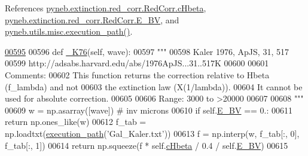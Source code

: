 \begin{DoxyVerb}
References \hyperlink{red__corr_8py_source_l00206}{pyneb.\-extinction.\-red\-\_\-corr.\-Red\-Corr.\-c\-Hbeta}, \hyperlink{red__corr_8py_source_l00203}{pyneb.\-extinction.\-red\-\_\-corr.\-Red\-Corr.\-E\-\_\-\-B\-V}, and \hyperlink{misc_8py_source_l00049}{pyneb.\-utils.\-misc.\-execution\-\_\-path()}.


\begin{DoxyCode}
\hypertarget{classpyneb_1_1extinction_1_1red__corr_1_1_red_corr_l00595}{}\hyperlink{classpyneb_1_1extinction_1_1red__corr_1_1_red_corr_a9958bee692760f5d5037a5b195142c01}{00595} 
00596     \textcolor{keyword}{def }\hyperlink{classpyneb_1_1extinction_1_1red__corr_1_1_red_corr_a9958bee692760f5d5037a5b195142c01}{\_K76}(self, wave):
00597         \textcolor{stringliteral}{"""}
00598 \textcolor{stringliteral}{        Kaler 1976, ApJS, 31, 517}
00599 \textcolor{stringliteral}{        http://adsabs.harvard.edu/abs/1976ApJS...31..517K}
00600 \textcolor{stringliteral}{        }
00601 \textcolor{stringliteral}{        Comments:}
00602 \textcolor{stringliteral}{        This function returns the correction relative to Hbeta (f\_lambda) and not}
00603 \textcolor{stringliteral}{        the extinction law (X(1/lambda)).}
00604 \textcolor{stringliteral}{        It cannot be used for absolute correction.}
00605 \textcolor{stringliteral}{        }
00606 \textcolor{stringliteral}{        Range: 3000 to >20000}
00607 \textcolor{stringliteral}{        }
00608 \textcolor{stringliteral}{        """}
00609         w = np.asarray([wave]) \textcolor{comment}{# inv microns}
00610         \textcolor{keywordflow}{if} self.\hyperlink{classpyneb_1_1extinction_1_1red__corr_1_1_red_corr_a0bc581bcaa8eeeb67b83ffdec58bf164}{E\_BV} == 0.:
00611             \textcolor{keywordflow}{return} np.ones\_like(w)
00612         f\_tab = np.loadtxt(\hyperlink{namespacepyneb_1_1utils_1_1misc_a937fc19e910346d9d288992e8eeab0ea}{execution\_path}(\textcolor{stringliteral}{'Gal\_Kaler.txt'}))
00613         f = np.interp(w, f\_tab[:, 0], f\_tab[:, 1])
00614         \textcolor{keywordflow}{return} np.squeeze(f * self.\hyperlink{classpyneb_1_1extinction_1_1red__corr_1_1_red_corr_aaf16ae2a0bdb5dd620f9db382ffeebc9}{cHbeta} / 0.4 / self.\hyperlink{classpyneb_1_1extinction_1_1red__corr_1_1_red_corr_a0bc581bcaa8eeeb67b83ffdec58bf164}{E\_BV})
00615     

\end{DoxyCode}
\hypertarget{classpyneb_1_1extinction_1_1red__corr_1_1_red_corr_af97fbc015537102bbc163263b8582986}{
}
\end{DoxyVerb}
